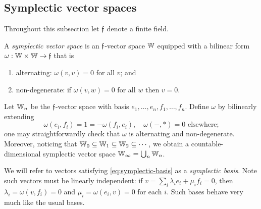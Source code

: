 \subsection{Symplectic vector spaces}
Throughout this subsection let $\mathfrak{f}$ denote a finite field.
\begin{definition}
    A \emph{symplectic vector space} is an $\mathfrak{f}$-vector space $\mathbb{W}$ 
    equipped with a bilinear form $\omega: \mathbb{W} \times \mathbb{W} \to \mathfrak{f}$ that is
    \begin{enumerate}
        \item alternating: $\omega(v, v) = 0$ for all $v$; and
        \item non-degenerate: if $\omega(v, w) = 0$ for all $w$ then $v = 0$.
    \end{enumerate}
\end{definition}

\begin{example}
    Let $\mathbb{W}_n$ be the $\mathfrak{f}$-vector space with basis $e_1  , \ldots, e_n, f_1, \ldots, f_n$.
    Define $\omega$ by bilinearly extending
    \begin{equation}\label{eq:symplectic-basis}
        \omega(e_i, f_i) = 1 = -\omega(f_i, e_i),\quad
        \omega(-, *) = 0 \text{ elsewhere;}
        \tag{\S}
    \end{equation}
    one may straightforwardly check that $\omega$ is alternating and non-degenerate.
    Moreover, noticing that $\mathbb{W}_0 \subseteq \mathbb{W}_1 \subseteq \mathbb{W}_2 \subseteq \cdots$,
    we obtain a countable-dimensional symplectic vector space $\mathbb{W}_\infty = \bigcup_n \mathbb{W}_n$.
\end{example}

We will refer to vectors satisfying \eqref{eq:symplectic-basis} as a \emph{symplectic basis}. 
Note such vectors must be linearly independent:
if $v = \sum_i \lambda_i e_i + \mu_i f_i = 0$, then $\lambda_i = \omega(v, f_i) = 0$ and $\mu_i = \omega(e_i, v) = 0$ for each $i$.
Such bases behave very much like the usual bases.

